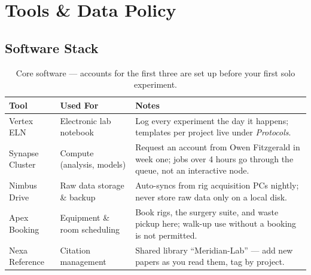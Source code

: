 \section{Tools \& Data Policy}
\label{sec:tooling}

\subsection*{Software Stack}
\begin{table}[h]
\centering
\small
\begin{tabular}{@{}p{2.6cm}p{3.4cm}p{7.0cm}@{}}
\toprule
\rowcolor{labpale}
\textbf{Tool} & \textbf{Used For} & \textbf{Notes} \\
\midrule
Vertex ELN & Electronic lab notebook & Log every experiment the day it happens; templates
per project live under \emph{Protocols}. \\
Synapse Cluster & Compute (analysis, models) & Request an account from Owen Fitzgerald in
week one; jobs over 4 hours go through the queue, not an interactive node. \\
Nimbus Drive & Raw data storage \& backup & Auto-syncs from rig acquisition PCs nightly;
never store raw data only on a local disk. \\
Apex Booking & Equipment \& room scheduling & Book rigs, the surgery suite, and waste pickup
here; walk-up use without a booking is not permitted. \\
Nexa Reference & Citation management & Shared library ``Meridian-Lab'' --- add new papers as
you read them, tag by project. \\
\bottomrule
\end{tabular}
\caption{Core software --- accounts for the first three are set up before your first solo
experiment.}
\end{table}

